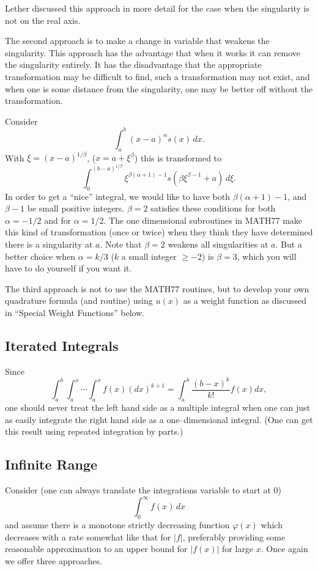 \documentclass[twoside]{MATH77}
\begin{document}
Lether \cite{Lether:1977:SOC} discussed this approach in more detail for
the case when the singularity is not on the real axis.

The second approach is to make a change in variable that weakens the
singularity.  This approach has the advantage that when it works it
can remove the singularity entirely.  It has the disadvantage that
the appropriate transformation may be difficult to find, such a
transformation may not exist, and when one is some distance from the
singularity, one may be better off without the transformation.

Consider
\begin{equation*}
\int_a^b (x-a)^\alpha s(x)\,dx.
\end{equation*}
With $\xi = (x-a)^{1 / \beta}$, ($x=a + \xi^\beta $) this is transformed
to
\begin{equation*}
\int_0^{(b-a)^{1/\beta}} \xi^{\beta (\alpha + 1)-1}
s(\beta \xi^{\beta - 1} + a)\, d\xi.
\end{equation*}
In order to get a ``nice'' integral, we would like to have both $\beta
(\alpha + 1) - 1$, and $\beta - 1$ be small positive integers. $\beta
= 2$ satisfies these conditions for both $\alpha = -1/2$ and for
$\alpha = 1/2$.  The one dimensional subroutines in MATH77 make this
kind of transformation (once or twice) when they think they have
determined there is a singularity at $a$.  Note that $\beta = 2$
weakens all singularities at $a$.  But a better choice when $\alpha =
k / 3$ ($k$ a small integer $\geq -2$) is $\beta = 3$, which you will
have to do yourself if you want it.

The third approach is not to use the MATH77 routines, but to develop
your own quadrature formula (and routine) using $u(x)$ as a weight
function as discussed in ``Special Weight Functions'' below.


\subsection{Iterated Integrals}\label{iter}
Since
\begin{equation*}
\int_a^b \int_a^x \cdots \int_a^x f(x) (dx)^{k+1} = \int_a^b \frac
{(b-x)^k}{k!} f(x) dx,
\end{equation*}
one should never treat the left hand side as a multiple integral when
one can just as easily integrate the right hand side as a
one--dimensional integral.  (One can get this result using repeated
integration by parts.)

\subsection{Infinite Range}\label{infinite}
Consider (one can always translate the integrations variable to start at 0)
\begin{equation*}
\int_0^\infty f(x)\,dx
\end{equation*}
and assume there is a monotone strictly decreasing function $\varphi(x)$
which decreases with a rate somewhat like that for $|f|$, preferably providing
some reasonable approximation to an upper bound for $|f(x)|$ for
large $x$.  Once again we offer three approaches.
\end{document}
